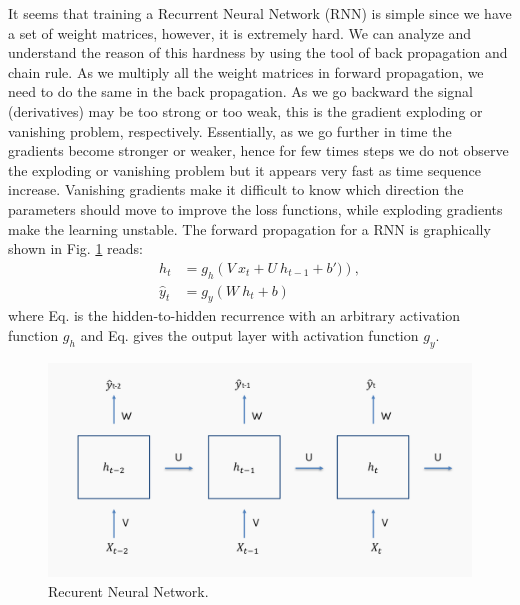 \documentclass[12pt,letterpaper]{article}
\begin{document}
It seems that training a Recurrent Neural Network (RNN) is simple since we have a set of weight matrices, however, it is extremely hard. We can  analyze and understand the reason of this hardness by using the tool of  back propagation and chain rule. As we multiply all the weight matrices in forward propagation, we need to do the same in the back propagation. As we go backward the signal (derivatives) may be too strong or too weak, this is the gradient exploding or vanishing problem, respectively.  Essentially, as we go further in time the gradients become  stronger or weaker, hence for few times steps we do not observe the exploding or vanishing problem but it appears very fast as time sequence increase. Vanishing gradients make it difficult to know which direction the parameters should move to improve the loss functions, while exploding gradients make the learning unstable.
%
The forward propagation for a RNN is graphically shown in Fig. \ref {fig.RNN} reads: 
\begin{align}
\label{eq:ht}
h_t &= g_h\left( V\ x_t+ U\ h_{t-1}+b') \right), \\
\label{eq:y}
\hat y_t &= g_y\left( W\ h_t +b\right)
\end{align}
where Eq. is the hidden-to-hidden recurrence with an arbitrary activation function $g_h$ and Eq. gives the output layer with activation function $g_y$.
%
\begin{figure}[ht!]
\centering 
\includegraphics[scale=.2]{rnn.png}
\caption{Recurent Neural Network. \label{fig.RNN}}
\end{figure}
\end{document}
